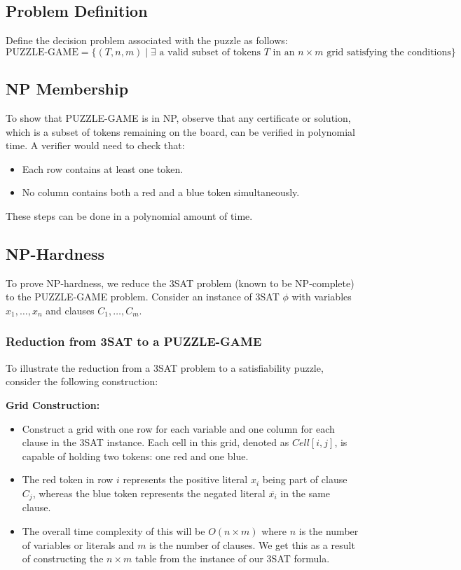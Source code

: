 \documentclass{article}
\begin{document}
\subsection*{Problem Definition}
Define the decision problem associated with the puzzle as follows:
\[
\text{PUZZLE-GAME} = \{(T, n, m) \mid \exists \text{ a valid subset of tokens } T \text{ in an } n \times m \text{ grid satisfying the conditions}\}
\]


\subsection*{NP Membership}
To show that PUZZLE-GAME is in NP, observe that any certificate or solution, which is a subset of tokens remaining on the board, can be verified in polynomial time. A verifier would need to check that:
\begin{itemize}
    \item Each row contains at least one token.
    \item No column contains both a red and a blue token simultaneously.
\end{itemize}

These steps can be done in a polynomial amount of time.

\subsection*{NP-Hardness}
To prove NP-hardness, we reduce the 3SAT problem (known to be NP-complete) to the PUZZLE-GAME problem. Consider an instance of 3SAT \(\phi\) with variables \(x_1, \dots, x_n\) and clauses \(C_1, \dots, C_m\).

\subsubsection*{Reduction from 3SAT to a PUZZLE-GAME}

To illustrate the reduction from a 3SAT problem to a satisfiability puzzle, consider the following construction:

\textbf{Grid Construction:}
\begin{itemize}
    \item Construct a grid with one row for each variable and one column for each clause in the 3SAT instance. Each cell in this grid, denoted as \(Cell[i, j]\), is capable of holding two tokens: one red and one blue.
    \item The red token in row \(i\) represents the positive literal \(x_i\) being part of clause \(C_j\), whereas the blue token represents the negated literal \(\overline{x_i}\) in the same clause.
    \item The overall time complexity of this will be $O(n\times m)$ where \(n\) is the number of variables or literals and \(m\) is the number of clauses. We get this as a result of constructing the $n \times m$ table from the instance of our 3SAT formula.
\end{itemize}
\end{document}
